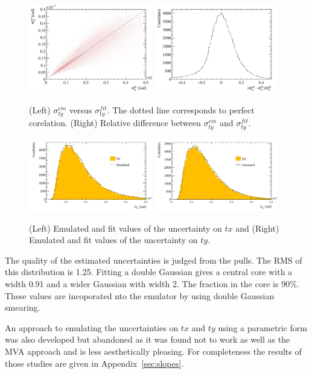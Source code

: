 \begin{figure}[h!]
\centering
\includegraphics[width=0.48\textwidth]{figs/corelation-ty.pdf}
\includegraphics[width=0.48\textwidth]{figs/difference-ty.pdf}
\caption{(Left)  $\sigma^{em}_{ty}$  versus  $\sigma^{fit}_{ty}$. The dotted line
  corresponds to perfect corelation. (Right) Relative difference
  between $\sigma^{em}_{ty}$  and  $\sigma^{fit}_{ty}$.}
\label{fig:corelty}
\end{figure}
%
\begin{figure}[h!]
\centering
\includegraphics[width=0.48\textwidth]{figs/etx.pdf}
\includegraphics[width=0.48\textwidth]{figs/ety.pdf}
\caption{(Left)  Emulated and fit values of the uncertainty on $tx$
  and (Right) Emulated and fit values of the uncertainty on $ty$. }
\label{fig:etxty}
\end{figure}
%

%
The quality of the estimated uncertainties is judged from the
pulls. The RMS of this
distribution is 1.25. Fitting a double
Gaussian gives a central core with a width 0.91 and a wider Gaussian
with width 2. The fraction in the core is $90 \%$. These values are
incoporated nto the emulator by using double Gaussian
smearing.  

An approach to emulating the uncertainties on $tx$ and $ty$ using a
parametric form was also developed but abandoned as it was found not
to work as well as the MVA approach and is less aesthetically pleasing. For completeness the results of
those studies are given in Appendix~\ref{sec:slopes}.